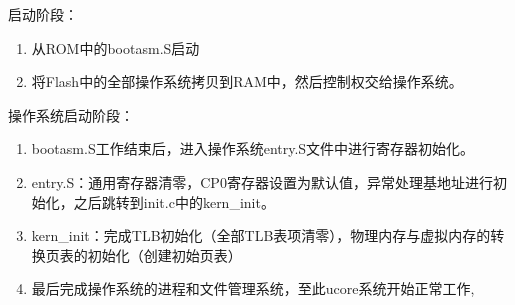         启动阶段：
        \begin{enumerate}
            \item
                从ROM中的bootasm.S启动
            \item
                将Flash中的全部操作系统拷贝到RAM中，然后控制权交给操作系统。
        \end{enumerate}

        操作系统启动阶段：
        \begin{enumerate}
            \item
                bootasm.S工作结束后，进入操作系统entry.S文件中进行寄存器初始化。
            \item
                entry.S：通用寄存器清零，CP0寄存器设置为默认值，异常处理基地址进行初始化，之后跳转到init.c中的kern\_init。
            \item
                kern\_init：完成TLB初始化（全部TLB表项清零），物理内存与虚拟内存的转换页表的初始化（创建初始页表）
            \item
                最后完成操作系统的进程和文件管理系统，至此ucore系统开始正常工作,
        \end{enumerate}
        

